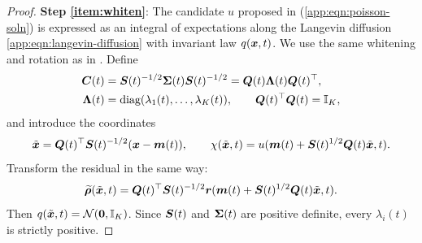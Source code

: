 \begin{proof}
\medskip
\textbf{Step \ref{item:whiten}}:
The candidate $u$ proposed in  (\cref{app:eqn:poisson-soln}) is expressed as an integral of expectations along the Langevin diffusion \cref{app:eqn:langevin-diffusion} with invariant law $q(\boldsymbol{x}, t)$. We use the same whitening and rotation as in . Define
\begin{equation*}
\begin{aligned}
    \boldsymbol{C}(t) &= \boldsymbol{S}(t)^{-1/2}\boldsymbol{\Sigma}(t)\boldsymbol{S}(t)^{-1/2} = \boldsymbol{Q}(t)\boldsymbol{\Lambda}(t)\boldsymbol{Q}(t)^\top,\\
    \boldsymbol{\Lambda}(t) &= \textrm{diag}(\lambda_1(t),\ldots,\lambda_K(t)), \qquad \boldsymbol{Q}(t)^\top\boldsymbol{Q}(t)=\mathbb{I}_K,
\end{aligned}
\end{equation*}
and introduce the coordinates
\begin{equation*}
    \tilde{\boldsymbol{x}} = \boldsymbol{Q}(t)^\top\boldsymbol{S}(t)^{-1/2}(\boldsymbol{x}-\boldsymbol{m}(t)), \qquad \chi(\tilde{\boldsymbol{x}},t) = u(\boldsymbol{m}(t)+\boldsymbol{S}(t)^{1/2}\boldsymbol{Q}(t)\tilde{\boldsymbol{x}},t).
\end{equation*}
Transform the residual in the same way:
\begin{equation*}
    \widetilde{\boldsymbol{\rho}}(\tilde{\boldsymbol{x}},t) = \boldsymbol{Q}(t)^\top\boldsymbol{S}(t)^{-1/2} \boldsymbol{r}(\boldsymbol{m}(t)+\boldsymbol{S}(t)^{1/2}\boldsymbol{Q}(t)\tilde{\boldsymbol{x}},t).
\end{equation*}
Then $q(\tilde{\boldsymbol{x}},t)=\mathcal{N}(\boldsymbol{0},\mathbb{I}_K)$. Since $\boldsymbol{S}(t)$ and $\boldsymbol{\Sigma}(t)$ are positive definite, every $\lambda_i(t)$ is strictly positive.


\end{proof}
